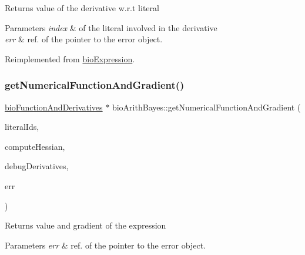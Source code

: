 \begin{DoxyReturn}{Returns}
value of the derivative w.\+r.\+t literal 
\end{DoxyReturn}

\begin{DoxyParams}{Parameters}
{\em index} & of the literal involved in the derivative \\
\hline
{\em err} & ref. of the pointer to the error object. \\
\hline
\end{DoxyParams}


Reimplemented from \hyperlink{classbio_expression_a5915579d1193f25f216c1e273c97f2ce}{bio\+Expression}.

\mbox{\label{classbio_arith_bayes_a3421312ddc6b7e0b080c497cdc53d1a5}} 
\subsubsection{\texorpdfstring{get\+Numerical\+Function\+And\+Gradient()}{getNumericalFunctionAndGradient()}}
{\footnotesize\ttfamily \hyperlink{classbio_function_and_derivatives}{bio\+Function\+And\+Derivatives} $\ast$ bio\+Arith\+Bayes\+::get\+Numerical\+Function\+And\+Gradient (\begin{DoxyParamCaption}\item[{vector$<$ pat\+U\+Long $>$}]{literal\+Ids,  }\item[{pat\+Boolean}]{compute\+Hessian,  }\item[{pat\+Boolean}]{debug\+Derivatives,  }\item[{pat\+Error $\ast$\&}]{err }\end{DoxyParamCaption})\hspace{0.3cm}{\ttfamily [virtual]}}

\begin{DoxyReturn}{Returns}
value and gradient of the expression 
\end{DoxyReturn}

\begin{DoxyParams}{Parameters}
{\em err} & ref. of the pointer to the error object. \\
\hline
\end{DoxyParams}


